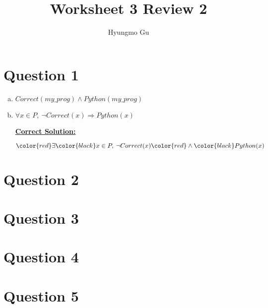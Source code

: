 \documentclass[12pt]{article}
\begin{document}
\title{Worksheet 3 Review 2}
\author{Hyungmo Gu}
\maketitle

\section*{Question 1}
\begin{enumerate}[a.]
    \item $Correct(my\_prog) \land Python(my\_prog)$
    \item

    $\forall x \in P,\: \neg Correct(x) \Rightarrow Python(x)$

    \begin{mdframed}
        \underline{\textbf{Correct Solution:}}

        $\color{red}\exists\color{black} x \in P,\: \neg Correct(x) \color{red}\land\color{black} Python(x)$
    \end{mdframed}
\end{enumerate}

\section*{Question 2}

\section*{Question 3}

\section*{Question 4}

\section*{Question 5}
\end{document}
